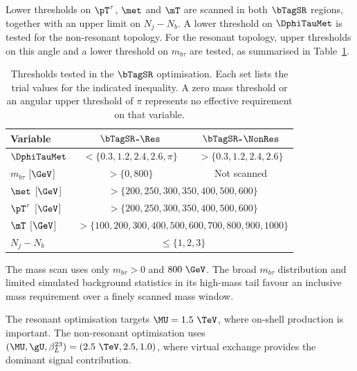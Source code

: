 Lower thresholds on $\pT^\tau$, $\met$ and $\mT$ are scanned in both $\bTagSR$ regions, together with an upper limit on $N_j-N_b$.
A lower threshold on $\DphiTauMet$ is tested for the non-resonant topology.
For the resonant topology, upper thresholds on this angle and a lower threshold on $m_{b\tau}$ are tested, as summarised in Table~\ref{tab:ch7_scan_variables}.

\begin{table}[htbp]
    \centering
    \small
    \caption{Thresholds tested in the $\bTagSR$ optimisation. Each set lists the trial values for the indicated inequality. A zero mass threshold or an angular upper threshold of $\pi$ represents no effective requirement on that variable.}
    \label{tab:ch7_scan_variables}
    \begin{tabular}{lcc}
        \toprule
        Variable & $\bTagSR$-$\Res$ & $\bTagSR$-$\NonRes$ \\
        \midrule
        $\DphiTauMet$ & $<\{0.3,1.2,2.4,2.6,\pi\}$ & $>\{0.3,1.2,2.4,2.6\}$ \\
        $m_{b\tau}$ [$\GeV$] & $>\{0,800\}$ & Not scanned \\
        $\met$ [$\GeV$] & \multicolumn{2}{c}{$>\{200,250,300,350,400,500,600\}$} \\
        $\pT^\tau$ [$\GeV$] & \multicolumn{2}{c}{$>\{200,250,300,350,400,500,600\}$} \\
        $\mT$ [$\GeV$] & \multicolumn{2}{c}{$>\{100,200,300,400,500,600,700,800,900,1000\}$} \\
        $N_j-N_b$ & \multicolumn{2}{c}{$\leq\{1,2,3\}$} \\
        \bottomrule
    \end{tabular}
\end{table}

The mass scan uses only $m_{b\tau}>0$ and $800~\GeV$.
The broad $m_{b\tau}$ distribution and limited simulated background statistics in its high-mass tail favour an inclusive mass requirement over a finely scanned mass window.

The resonant optimisation targets $\MU=1.5~\TeV$, where on-shell production is important.
The non-resonant optimisation uses $(\MU,\gU,\beta_L^{23})=(2.5~\TeV,2.5,1.0)$, where virtual exchange provides the dominant signal contribution.

